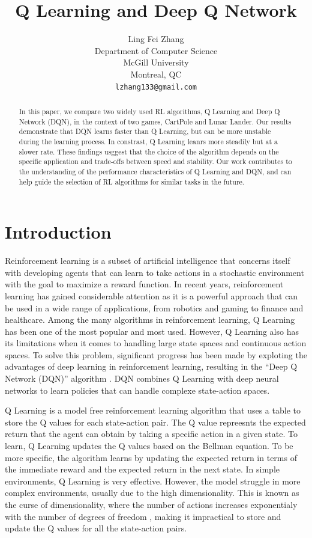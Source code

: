 \documentclass{article}
\title{Q Learning and Deep Q Network}
\author{%
      Ling Fei Zhang\\
      Department of Computer Science\\ McGill University\\ Montreal, QC \\
      \texttt{lzhang133@gmail.com} \\
}
\begin{document}
\maketitle

\begin{abstract}
      In this paper, we compare two widely used RL algorithms, Q Learning and Deep Q Network (DQN), in the context of two games, CartPole and Lunar Lander. Our results demonstrate that DQN learns faster than Q Learning, but can be more unstable during the learning process. In constrast, Q Learning leanrs more steadily but at a slower rate. These findings usggest that the choice of the algorithm depends on the specific application and trade-offs between speed and stability. Our work contributes to the understanding of the performance characteristics of Q Learning and DQN, and can help guide the selection of RL algorithms for similar tasks in the future.
\end{abstract}

\section{Introduction}

Reinforcement learning is a subset of artificial intelligence that concerns
itself with developing agents that can learn to take actions in a stochastic
environment with the goal to maximize a reward function. In recent years,
reinforcement learning has gained considerable attention as it is a powerful
approach that can be used in a wide range of applications, from robotics and
gaming to finance and healthcare. Among the many algorithms in reinforcement
learning, Q Learning has been one of the most popular and most used. However, Q
Learning also has its limitations when it comes to handling large state spaces
and continuous action spaces. To solve this problem, significant progress has
been made by exploting the advantages of deep learning in reinforcement
learning, resulting in the ``Deep Q Network (DQN)'' algorithm
\cite{DBLP:journals/corr/MnihKSGAWR13}. DQN combines Q Learning with deep
neural networks to learn policies that can handle complexe state-action spaces.

Q Learning is a model free reinforcement learning algorithm that uses a table
to store the Q values for each state-action pair. The Q value repreesnts the
expected return that the agent can obtain by taking a specific action in a
given state. To learn, Q Learning updates the Q values based on the Bellman
equation. To be more specific, the algorithm learns by updating the expected
return in terms of the immediate reward and the expected return in the next
state. In simple environments, Q Learning is very effective. However, the model
struggle in more complex environments, usually due to the high dimensionality.
This is known as the curse of dimensionality, where the number of actions
increases exponentialy with the number of degrees of freedom
\cite{soft_update}, making it impractical to store and update the Q values for
all the state-action pairs.
\end{document}
